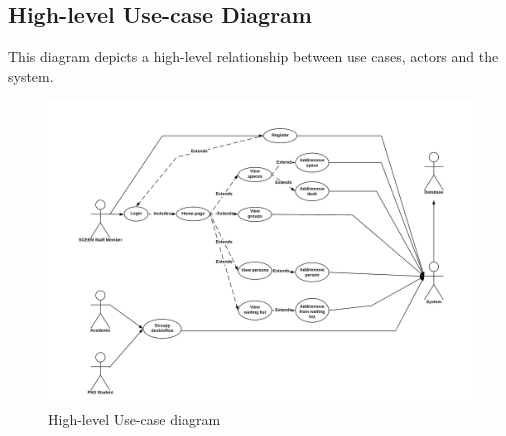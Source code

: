 \documentclass[11pt,a4paper]{article}
\begin{document}
\subsection{High-level Use-case Diagram}
This diagram depicts a high-level relationship between use cases, actors and the system.

\begin{figure}[!h]
    \centering
    \includegraphics[width=\linewidth]{use_case.png}
    \caption{High-level Use-case diagram}
    \label{fig:basic_2}
\end{figure}
\end{document}
